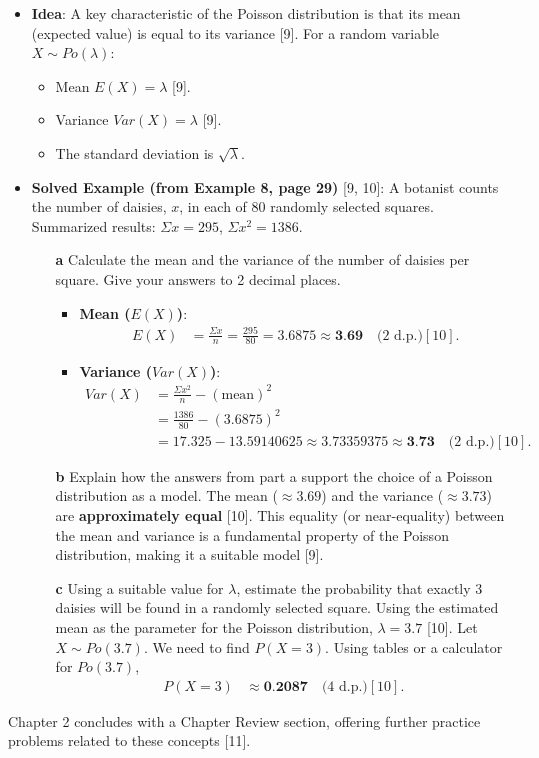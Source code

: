 \documentclass[12pt]{article}
\begin{document}
\begin{itemize}
    \item \textbf{Idea}: A key characteristic of the Poisson distribution is that its mean (expected value) is equal to its variance [9]. For a random variable $X \sim Po(\lambda)$:
    \begin{itemize}
        \item Mean $E(X) = \lambda$ [9].
        \item Variance $Var(X) = \lambda$ [9].
        \item The standard deviation is $\sqrt{\lambda}$.
    \end{itemize}

    \item \textbf{Solved Example (from Example 8, page 29)} [9, 10]:
    A botanist counts the number of daisies, $x$, in each of 80 randomly selected squares. Summarized results: $\Sigma x = 295$, $\Sigma x^2 = 1386$.
    \begin{enumerate}
        \item[\textbf{a}] Calculate the mean and the variance of the number of daisies per square. Give your answers to 2 decimal places.
        \begin{itemize}
            \item \textbf{Mean ($E(X)$)}:
            \begin{align*}
            E(X) &= \frac{\Sigma x}{n} = \frac{295}{80} = 3.6875 \approx \textbf{3.69} \quad \text{(2 d.p.)} [10].
            \end{align*}
            \item \textbf{Variance ($Var(X)$)}:
            \begin{align*}
            Var(X) &= \frac{\Sigma x^2}{n} - (\text{mean})^2 \\
            &= \frac{1386}{80} - (3.6875)^2 \\
            &= 17.325 - 13.59140625 \approx 3.73359375 \approx \textbf{3.73} \quad \text{(2 d.p.)} [10].
            \end{align*}
        \end{itemize}
        \item[\textbf{b}] Explain how the answers from part a support the choice of a Poisson distribution as a model.
        The mean ($\approx 3.69$) and the variance ($\approx 3.73$) are \textbf{approximately equal} [10]. This equality (or near-equality) between the mean and variance is a fundamental property of the Poisson distribution, making it a suitable model [9].
        \item[\textbf{c}] Using a suitable value for $\lambda$, estimate the probability that exactly 3 daisies will be found in a randomly selected square.
        Using the estimated mean as the parameter for the Poisson distribution, $\lambda = 3.7$ [10].
        Let $X \sim Po(3.7)$. We need to find $P(X=3)$.
        Using tables or a calculator for $Po(3.7)$,
        \begin{align*}
        P(X=3) &\approx \textbf{0.2087} \quad \text{(4 d.p.)} [10].
        \end{align*}
    \end{enumerate}
\end{itemize}

\vspace{0.5cm}
Chapter 2 concludes with a Chapter Review section, offering further practice problems related to these concepts [11].
\end{document}
